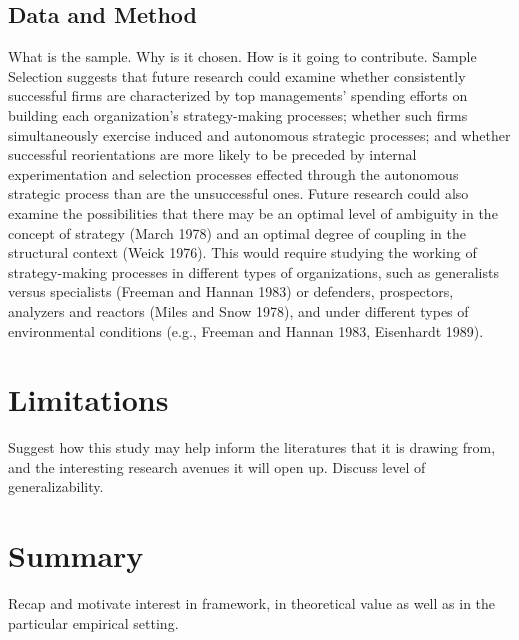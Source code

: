 \documentclass[12pt,letterpaper]{article}
\begin{document}
\subsection{Data and Method}
What is the sample. Why is it chosen. How is it going to contribute.
{Sample Selection}
\cite{Burgelman1991} suggests that future research could examine whether consistently successful firms are characterized by top managements' spending efforts on building each organization's strategy-making processes; whether such firms simultaneously exercise induced and autonomous strategic processes; and whether successful reorientations are more likely to be preceded by internal experimentation and selection processes effected through the autonomous strategic process than are the unsuccessful ones. Future research could also examine the possibilities that there may be an optimal level of ambiguity in the concept of strategy (March 1978) and an optimal degree of coupling in the structural context (Weick 1976). This would require studying the working of strategy-making processes in different types of organizations, such as generalists versus specialists (Freeman and Hannan 1983) or defenders, prospectors, analyzers and reactors (Miles and Snow 1978), and under different types of environmental conditions (e.g., Freeman and Hannan 1983, Eisenhardt 1989). 

\section{Limitations}
Suggest how this study may help inform the literatures that it is drawing from, and the interesting research avenues it will open up. Discuss level of generalizability.

\section{Summary}
Recap and motivate interest in framework, in theoretical value as well as in the particular empirical setting.



\begin{singlespace}
\renewcommand{\refname}{REFERENCES}
 

\end{singlespace}
\end{document}
